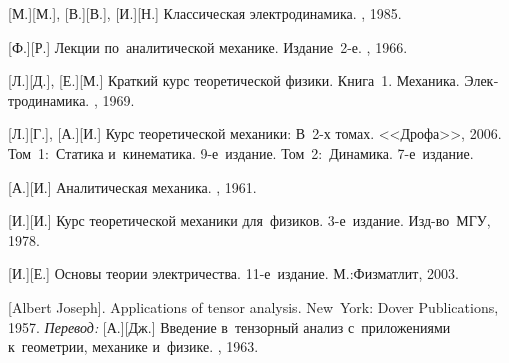 \begin{thebibliography}{123}
\begin{otherlanguage}{russian}
[М.][М.], [В.][В.], [И.][Н.] Классическая электродинамика. \naukapublisher, 1985. 

[Ф.][Р.] Лекции по~аналитической механике. Издание~2\hbox{-}е. \naukapublisher, 1966. 

[Л.][Д.], [Е.][М.] Краткий курс теоретической физики. Книга~1. Механика. Электродинамика. \naukapublisher, 1969. 

[Л.][Г.], [А.][И.] Курс теоретической механики: В~2\hbox{-}х томах. <<Дрофа>>, 2006.
Том~1:~Статика и~кинематика. 9\hbox{-}е~издание. 
Том~2:~Динамика. 7\hbox{-}е~издание. 

[А.][И.] Аналитическая механика. \fizmatgiz, 1961. 

[И.][И.] Курс теоретической механики для~физиков. 3\hbox{-}е~издание. Изд\hbox{-}во~МГУ, 1978. 

[И.][Е.] %
Основы теории электричества. 11\hbox{-}е~издание. М.:\;Физматлит, 2003.

%
%



[Albert Joseph]. Applications of tensor analysis. New~York: Dover Publications, 1957. 
\emph{Перевод:} [А.][Дж.] Введение в~тензорный анализ с~приложениями к~геометрии, механике и~физике. \fizmatgiz, 1963. 


\end{otherlanguage}
\end{thebibliography}
